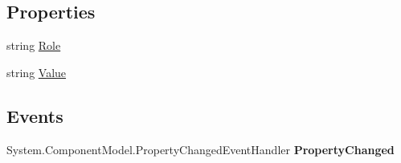 \subsection*{Properties}
\begin{DoxyCompactItemize}
\item 
\hypertarget{class_price___comparison_1_1amazon_1_1ecs_1_1_item_attributes_creator_a945c16c7482ba44083e3e75d807b0406}{string \hyperlink{class_price___comparison_1_1amazon_1_1ecs_1_1_item_attributes_creator_a945c16c7482ba44083e3e75d807b0406}{Role}}\label{class_price___comparison_1_1amazon_1_1ecs_1_1_item_attributes_creator_a945c16c7482ba44083e3e75d807b0406}

\begin{DoxyCompactList}\small\item\em \end{DoxyCompactList}\item 
\hypertarget{class_price___comparison_1_1amazon_1_1ecs_1_1_item_attributes_creator_af15c0adde47a24ae8c10a692cc50939e}{string \hyperlink{class_price___comparison_1_1amazon_1_1ecs_1_1_item_attributes_creator_af15c0adde47a24ae8c10a692cc50939e}{Value}}\label{class_price___comparison_1_1amazon_1_1ecs_1_1_item_attributes_creator_af15c0adde47a24ae8c10a692cc50939e}

\begin{DoxyCompactList}\small\item\em \end{DoxyCompactList}\end{DoxyCompactItemize}
\subsection*{Events}
\begin{DoxyCompactItemize}
\item 
\hypertarget{class_price___comparison_1_1amazon_1_1ecs_1_1_item_attributes_creator_a40eae9199bb91acd8ded694bd9b98ec4}{System.\-Component\-Model.\-Property\-Changed\-Event\-Handler {\bfseries Property\-Changed}}\label{class_price___comparison_1_1amazon_1_1ecs_1_1_item_attributes_creator_a40eae9199bb91acd8ded694bd9b98ec4}

\end{DoxyCompactItemize}
